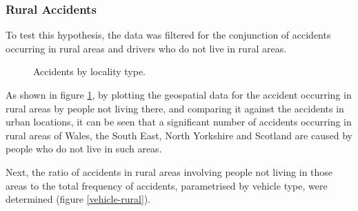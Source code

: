 \documentclass[12pt]{article}
\begin{document}
\subsubsection{Rural Accidents}

To test this hypothesis, the data was filtered for the conjunction of accidents occurring in rural areas and drivers who do not live in rural areas. 

\begin{figure}[h]
\centering     %
{}
\caption{Accidents by locality type.}
\label{accidents-locality}
\end{figure}

As shown in figure \ref{accidents-locality}, by plotting the geospatial data for the accident occurring in rural areas by people not living there, and comparing it against the accidents in urban locations, it can be seen that a significant number of accidents occurring in rural areas of Wales, the South East, North Yorkshire and Scotland are caused by people who do not live in such areas.

Next, the ratio of accidents in rural areas involving people not living in those areas to the total frequency of accidents, parametrised by vehicle type, were determined (figure \ref{vehicle-rural}).
\end{document}
